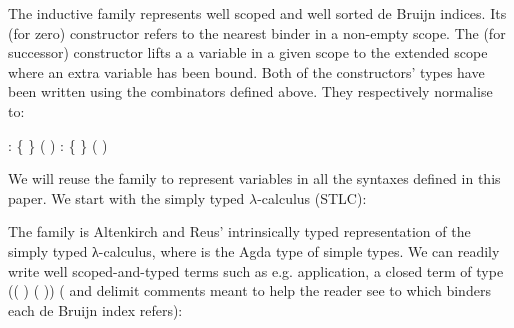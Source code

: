 \begin{minipage}{\textwidth}
\end{minipage}

The inductive family  represents well scoped and well sorted
de Bruijn indices. Its  (for zero) constructor refers to the
nearest binder in a non-empty scope. The  (for successor)
constructor lifts a a variable in a given scope to the extended scope
where an extra variable has been bound. Both of the constructors'
types have been written using the combinators defined above.  They
respectively normalise to:
\begin{center}
   : { \{ \}
               ( \AIC{::} )}
  \qquad
   : { \{  \}
               
               ( \AIC{::} )}
\end{center}
We will reuse the  family to represent variables in all the
syntaxes defined in this paper. We start with the simply typed
$\lambda$-calculus (STLC):
\begin{center}
  \begin{minipage}[t]{0.4\textwidth}
  \end{minipage}
  \begin{minipage}[t]{0.5\textwidth}
  \end{minipage}
\end{center}

The   family  is Altenkirch and Reus'
intrinsically typed representation of the simply typed λ-calculus,
where  is the Agda type of simple types.  We can readily
write well scoped-and-typed terms such as e.g. application, a closed
term of type {((  )  ( 
  ))} (\AC{\{-} and \AC{-\}} delimit comments meant to help the
reader see to which binders each de Bruijn index refers):

\begin{center}
\end{center}


